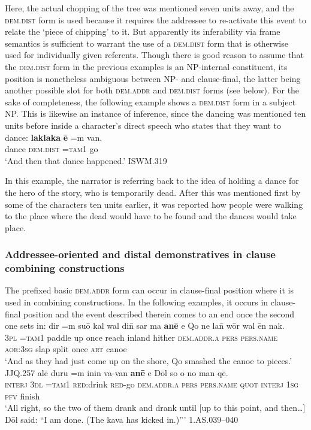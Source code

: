 \documentclass[output=paper
,modfonts
,nonflat]{langsci/langscibook}
\begin{document}
\noindent
Here, the actual chopping of the tree was mentioned seven  units away, and the \textsc{dem.dist} form is used because it requires the addressee to re-activate this event to relate the `piece of chipping' to it. But apparently its inferability via frame semantics is sufficient to warrant the use of a \textsc{dem.dist} form that is otherwise used for individually given referents. Though there is good reason to assume that the \textsc{dem.dist} form in the previous examples is an NP-internal constituent, its position is nonetheless ambiguous between NP- and clause-final, the latter being another possible slot for both \textsc{dem.addr} and \textsc{dem.dist} forms (see below). For the sake of completeness, the following example shows a \textsc{dem.dist} form in a subject NP. This is likewise an instance of inference, since the dancing was mentioned ten  units before inside a character's direct speech who states that they want to dance:
\ea	\label{ex53}
\gll		\textbf{laklaka} \textbf{	\=e}			=m 		van.		\\
		dance	\textsc{dem.dist}		\textsc{=tam1}		go		\\
\glt	`And then that dance happened.'	\hfill{ISWM.319}
\z

\noindent
In this example, the narrator is referring back to the idea of holding a dance for the hero of the story, who is temporarily dead. After this was mentioned first by some of the characters ten  units earlier, it was reported how people were walking to the place where the dead would have to be found and the dances would take place.

\subsubsection{Addressee-oriented and distal demonstratives in clause combining constructions}
The prefixed basic \textsc{dem.addr} form can occur in clause-final position where it is used in  combining constructions. In the following examples, it occurs in clause-final position and the event described therein comes to an end once the second one sets in:
\ea	\label{ex54}
\gll		dir	=m 		su\=o 		kal 	wal 	di\=n sar 		ma 		\textbf{an\=e}		e 		Qo{\textquotesingle} 	ne 		la\=n 	w\=or 	wal 	\=en 	nak.		\\
		\textsc{3pl}	\textsc{=tam1}	paddle	up		once	reach	inland		hither		\textsc{dem.addr.a}	\textsc{pers}	\textsc{pers.name}		\textsc{aor:3sg}	slap	split	once	\textsc{art}	canoe	\\
\glt	`And as they had just come up on the shore, Qo{\textquotesingle} smashed the canoe to pieces.'\\\hfill{JJQ.257}
\z
\ea	\label{ex55}
\gll		al\=e		duru	=m		inin			va-van	\textbf{an\=e}				e		D\=ol	so		o			no		man	q\=e{\textquotesingle}.		\\
		\textsc{interj}	\textsc{3dl}	\textsc{=tam1}	\textsc{red:}drink	\textsc{red-}go	\textsc{dem.addr.a}	\textsc{pers}	\textsc{pers.name}	\textsc{quot}	\textsc{interj}	\textsc{1sg}	\textsc{pfv}	finish		\\
\glt	`All right, so the two of them drank and drank until [up to this point, and then…] D\=ol said: ``I am done. (The kava has kicked in.)'''	\hfill{1.AS.039--040}
\z
\end{document}
